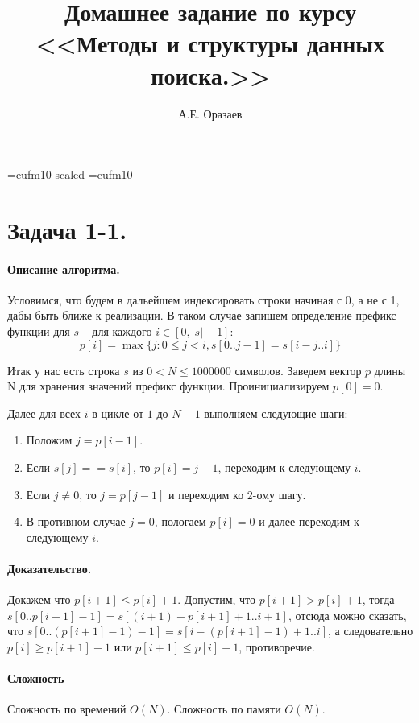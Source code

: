 \documentclass[12pt]{article}
\title{\bf Домашнее задание по курсу \\ <<Методы
и структуры данных поиска.>>}
\author{А.Е. Оразаев}
\date{}
\begin{document}
\voffset=-20mm
\hoffset=-12mm
\font\Got=eufm10 scaled \font\Got=eufm10

\maketitle

\section{Задача 1-1.}
\paragraph{Описание алгоритма.}
Условимся, что будем в дальейшем индексировать строки начиная с 0,
а не с 1, дабы быть ближе к реализации. В таком случае запишем определение
префикс функции для $ s $ -- для каждого $ i \in [0, |s| - 1] $:
$$
    p[i] = \max\{j: 0 \le j < i, s[0 .. j - 1] = s[i - j .. i]\}
$$

Итак у нас есть строка $ s $ из $ 0 < N \le 1000000$ символов.
Заведем вектор $ p $ длины N для хранения значений префикс функции.
Проинициализируем $ p[0] = 0 $.

Далее для всех $ i $ в цикле от $ 1 $ до $ N - 1 $ выполняем следующие шаги:
\begin{enumerate}
    \item Положим $ j = p[i - 1] $.
    \item Если $ s[j] == s[i] $, то $ p[i] = j + 1 $, переходим
          к следующему $ i $.
    \item Если $ j \ne 0 $, то $ j = p[j - 1] $ и переходим ко 2-ому шагу.
    \item В противном случае $ j = 0 $, пологаем $ p[i] = 0 $ и далее
          переходим к следующему $ i $.
\end{enumerate}



\paragraph{Доказательство.}
Докажем что $ p[i + 1] \le p[i] + 1 $.
Допустим, что $ p[i + 1] > p[i] + 1 $, тогда
$ s[0 .. p[i + 1] - 1] = s[(i + 1) - p[i + 1] + 1.. i + 1] $, отсюда можно
сказать, что $ s[0 .. (p[i + 1] - 1) - 1] = s[i - (p[i + 1] - 1) + 1 .. i] $,
а следовательно $ p[i] \ge p[i + 1] - 1 $ или $ p[i + 1] \le p[i] + 1 $,
противоречие.

\paragraph{Сложность}
Сложность по времений $ O(N) $.
Сложность по памяти $ O(N) $.
\end{document}
